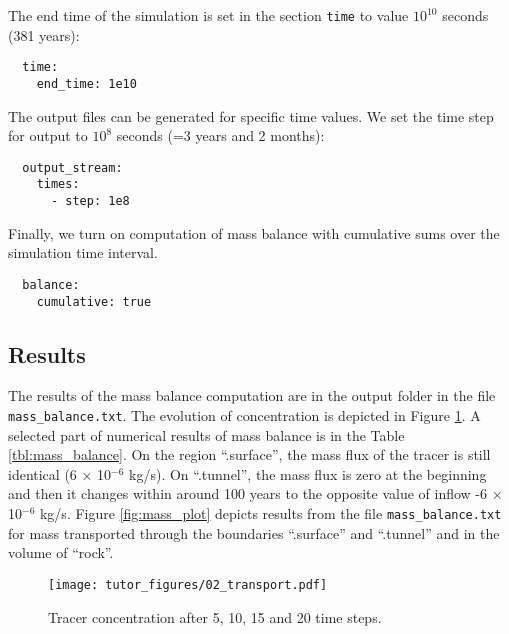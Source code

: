 The end time of the simulation is set in the section \texttt{time} to
value \(10^{10}\) seconds (381 years):

\begin{verbatim}
  time:
    end_time: 1e10
\end{verbatim}

The output files can be generated for specific time values. We set the
time step for output to \(10^8\) seconds (=3 years and 2 months):

\begin{verbatim}
  output_stream:
    times:
      - step: 1e8
\end{verbatim}

Finally, we turn on computation of mass balance with cumulative sums
over the simulation time interval.

\begin{verbatim}
  balance:
    cumulative: true
\end{verbatim}

\subsection{Results}

The results of the mass balance computation are in the output folder in
the file \texttt{mass\_balance.txt}. The evolution of concentration is
depicted in Figure \ref{fig:transport}. A selected part of numerical
results of mass balance is in the Table \ref{tbl:mass_balance}. On the
region ``.surface'', the mass flux of the tracer is still identical (6 ×
10\({}^{-6}\) kg/s). On ``.tunnel'', the mass flux is zero at the
beginning and then it changes within around 100 years to the opposite
value of inflow -6 × 10\({}^{-6}\) kg/s. Figure \ref{fig:mass_plot}
depicts results from the file \texttt{mass\_balance.txt} for mass
transported through the boundaries ``.surface'' and ``.tunnel'' and in
the volume of ``rock''.

\begin{figure}
\hypertarget{fig:transport}{%
\centering
\texttt{[image: tutor\_figures/02\_transport.pdf]}
\caption{Tracer concentration after 5, 10, 15 and 20 time
steps.}\label{fig:transport}
}
\end{figure}

